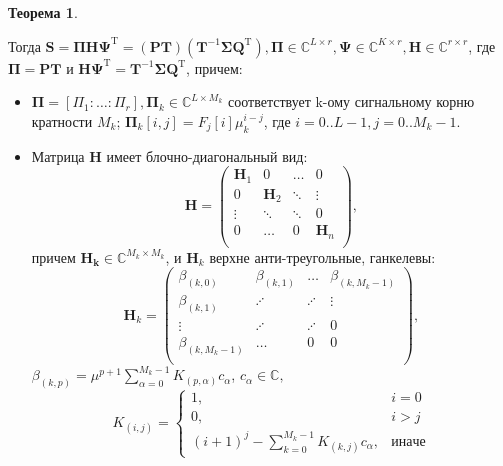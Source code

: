 \documentclass[specialist,
               substylefile = spbu_report.rtx,
               subf,href,colorlinks=true, 12pt]{disser}
\theoremstyle{definition}
\newtheorem{theorem}{Теорема}
\begin{document}
\begin{theorem}
\begin{enumerate}
        Тогда $\mathbf{S} = \mathbf{\Pi H\Psi}^{\mathrm{T}} = (\mathbf{PT})(\mathbf{T}^{-1}\mathbf{\Sigma Q}^{\mathrm{T}}), \mathbf{\Pi} \in \mathbb{C}^{L \times r}, \mathbf{\Psi} \in \mathbb{C}^{K \times r}, \mathbf{H} \in \mathbb{C}^{r \times r}$, где $\mathbf{\Pi} = \mathbf{PT}$ и $\mathbf{H\Psi}^{\mathrm{T}} = \mathbf{T}^{-1}\mathbf{\Sigma Q}^{\mathrm{T}}$, причем:
        \begin{itemize}
            \item $\mathbf{\Pi} = [\Pi_1: \ldots :\Pi_r], \mathbf{\Pi}_k \in \mathbb{C}^{L \times M_k}$ соответствует k-ому сигнальному корню кратности $M_k$; $\mathbf{\Pi}_k[i, j] = F_j[i]\mu_k^{i - j}$, где $i = 0..L-1, j = 0..M_k-1$.
            \item Матрица $\mathbf{H}$ имеет блочно-диагональный вид:
            \begin{equation*}
                \mathbf{H} = \begin{pmatrix}
                    \mathbf{H}_1 & 0 & \ldots & 0\\
                    0 & \mathbf{H}_2 & \ddots & \vdots \\
                    \vdots & \ddots & \ddots & 0 \\
                    0 & \ldots & 0 & \mathbf{H}_n \\
                    \end{pmatrix},
            \end{equation*}
            причем $\mathbf{H_k} \in \mathbb{C}^{M_k \times M_k}$, и $\mathbf{H}_k$ верхне анти-треугольные, ганкелевы:
            \begin{equation*}
                \mathbf{H}_k = \begin{pmatrix}
                    \beta _{(k, 0)} & \beta _{(k, 1)} & \ldots & \beta _{(k, M_k - 1)}\\
                    \beta _{(k, 1)} & \iddots & \iddots & \vdots \\
                    \vdots & \iddots & \iddots & 0 \\
                    \beta _{(k, M_k - 1)} & \ldots & 0 & 0 \\
                    \end{pmatrix},
            \end{equation*}
            $\beta_{(k, p)} = \mu^{p + 1} \sum_{\alpha = 0}^{M_k - 1}K_{(p, \alpha)}c_{\alpha}$, $c_{\alpha} \in \mathbb{C},$
            \begin{equation*}
                K_{(i, j)} = \begin{cases}
                1, & i = 0 \\
                0, & i > j \\
                (i + 1)^j - \sum_{k = 0}^{M_k - 1}K_{(k, j)}c_{\alpha}, & иначе
                \end{cases}
            \end{equation*}
            

\end{itemize}
\end{enumerate}
\end{theorem}
\end{document}
